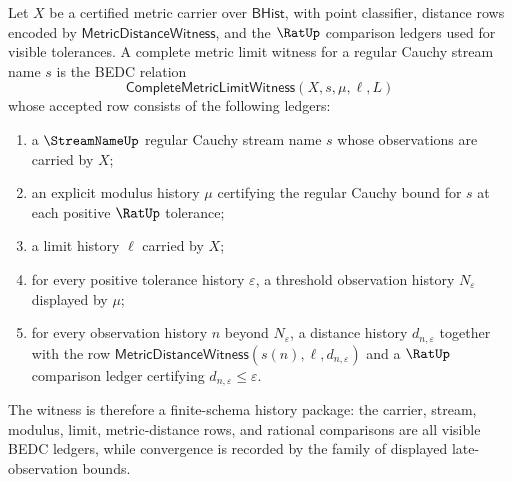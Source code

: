 \begin{definition}
\label{def:completemetric-limit-witness}
Let $X$ be a certified metric carrier over $\mathsf{BHist}$, with point
classifier, distance rows encoded by $\mathsf{MetricDistanceWitness}$, and
the $\RatUp$ comparison ledgers used for visible tolerances. A complete metric
limit witness for a regular Cauchy stream name $s$ is the BEDC relation
$$
\mathsf{CompleteMetricLimitWitness}(X,s,\mu,\ell,L)
$$
whose accepted row consists of the following ledgers:
\begin{enumerate}
  \item a $\StreamNameUp$ regular Cauchy stream name $s$ whose observations
  are carried by $X$;
  \item an explicit modulus history $\mu$ certifying the regular Cauchy
  bound for $s$ at each positive $\RatUp$ tolerance;
  \item a limit history $\ell$ carried by $X$;
  \item for every positive tolerance history $\varepsilon$, a threshold
  observation history $N_{\varepsilon}$ displayed by $\mu$;
  \item for every observation history $n$ beyond $N_{\varepsilon}$, a
  distance history $d_{n,\varepsilon}$ together with the row
  $\mathsf{MetricDistanceWitness}(s(n),\ell,d_{n,\varepsilon})$ and a
  $\RatUp$ comparison ledger certifying
  $d_{n,\varepsilon}\leq\varepsilon$.
\end{enumerate}
The witness is therefore a finite-schema history package: the carrier,
stream, modulus, limit, metric-distance rows, and rational comparisons are all
visible BEDC ledgers, while convergence is recorded by the family of displayed
late-observation bounds.
\end{definition}

